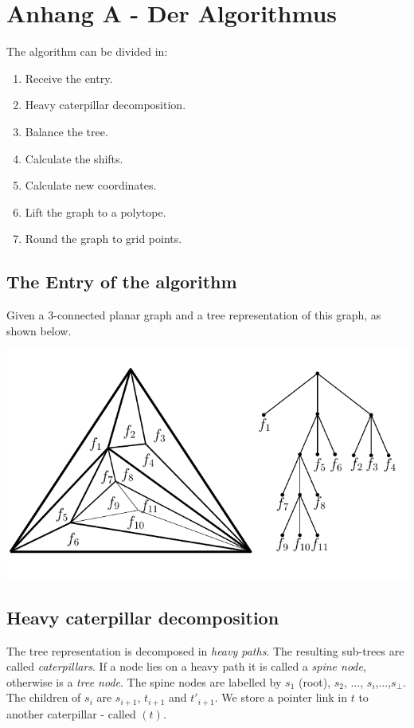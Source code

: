 \chapter*{Anhang A - Der Algorithmus}

The algorithm can be divided in:

\begin{enumerate}
\item Receive the entry.
\item Heavy caterpillar decomposition.
\item Balance the tree.
\item Calculate the shifts.
\item Calculate new coordinates.
\item Lift the graph to a polytope. 
\item Round the graph to grid points.
\end{enumerate}
 

\section*{The Entry of the algorithm}

Given a $3$-connected planar graph and a tree representation of this graph, as shown below.

\begin{center}
\includegraphics[scale=0.7]{./figures/graph_tree.png} 
\end{center}

\section*{Heavy caterpillar decomposition}
The tree representation is decomposed in \textit{heavy paths}. The resulting sub-trees are called \textit{caterpillars}. If a node lies on a heavy path it is called a \textit{spine node}, otherwise is a \textit{tree node}. The spine nodes are labelled by $s_1$ (root), $s_2$, ..., $s_i$,...,$s_\bot$. The children of $s_i$ are $s_{i+1}$, $t_{i+1}$ and $t'_{i+1}$. We store a pointer link in $t$ to another caterpillar - called $(t)$.

